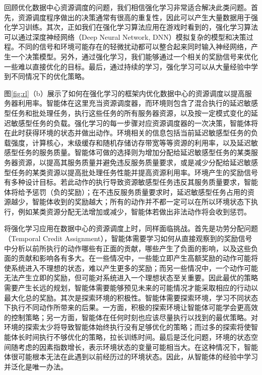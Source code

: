 回顾优化数据中心资源调度的问题，我们相信强化学习非常适合解决此类问题。首先，资源调度程序做出的决策通常有很高的重复性，因此可以产生大量数据用于强化学习训练。其次，正如我们在强化学习算法应用在游戏\cite{mnih2015human}\cite{evans2016deepmind}时看到的，强化学习算法可以通过深度神经网络（Deep Neural Network, DNN）模拟复杂的模型和决策过程。不同的信号和环境可能存在的轻微扰动都可以整合起来同时输入神经网络，产生一个决策模型。另外，通过强化学习，我们能够通过一个相关的奖励信号来优化一些难以直接优化的目标。最后，通过持续的学习，强化学习可以从大量经验中学到不同情况下的优化策略。

图\ref{fig:rl}（b）展示了如何在强化学习的框架内优化数据中心的资源调度以提高服务器利用率。智能体在这里充当资源调度器，而环境则包含了混合执行的延迟敏感型任务和批处理任务，执行这些任务的所有服务器资源，以及按一定模式变化的延迟敏感型任务的负载。强化学习的每一步骤对应资源调度器的一次决策，智能体将在此时获得环境的状态并做出动作。环境相关的信息包括当前延迟敏感型任务的负载强度，计算核心，末级缓存和随机存储访存带宽等等资源的利用率，以及延迟敏感型任务的服务质量。智能体可做的选择则为增加分配给延迟敏感型任务的某类服务器资源，以提高其服务质量并避免违反服务质量要求，或是减少分配给延迟敏感型任务的某类资源以提高批处理任务性能并提高资源利用率。环境产生的奖励信号有多种设计目标。若此动作的执行导致资源敏感型任务违反其服务质量要求，智能体将给予惩罚（负的奖励）；在不违反服务质量要求时，延迟敏感型任务占用的资源越少，智能体收到的奖励越大；所有的动作并不都一定可以在所以环境状态下执行，例如某类资源分配无法增加或减少，智能体若做出非法动作将会收到惩罚。

将强化学习应用在数据中心的资源调度上时，同样面临挑战。首先是功劳分配问题（Temporal Credit Assignment），智能体需要学习如何从直接观察到的奖励信号中分析以前所执行的动作哪些有正面的贡献，哪些产生了负面的影响，以及这些负面的贡献和影响各有多大。在一些情况中，一些能立即产生高额奖励的动作可能将使系统进入不理想的状态，难以产生更多的奖励；而另一些情况中，一个动作可能无法产生立即的奖励，但可能对系统进入一个理想状态至关重要。因此最优的策略需要产生长远的规划，智能体需要能够预见未来的可能情况才能采取相应的行动以最大化总的奖励。其次是探索环境的积极性。智能体需要探索环境，学习不同状态下执行不同动作所带来的后果。一方面，积极的探索环境让智能体可能学会更高效的控制策略；另一方面，智能体在任何时刻也应该尽量执行以找到的最优策略。对环境的探索太少将导致智能体始终执行没有足够优化的策略；而过多的探索将使智能体长时间执行不够优化的策略，拉长训练时间。最后是泛化问题，环境的状态空间随考虑的因素指数增长，表示环境状态的变量可能相当大。在这种情况下，智能体很可能根本无法在此遇到以前经历过的环境状态。因此，从智能体的经验中学习并泛化是唯一办法。

